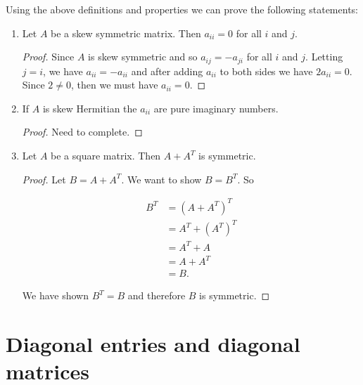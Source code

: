 \documentclass[12pt]{article}
\theoremstyle{definition}
\begin{document}
Using the above definitions and properties we can prove the following statements:

\begin{enumerate}
\item Let $A$ be a skew symmetric matrix. Then $a_{ii} = 0$ for all $i$ and $j$.

\begin{proof}
Since $A$ is skew symmetric and so $a_{ij} = -a_{ji}$ for all $i$ and $j$. Letting $j = i$,
we have $a_{ii} = -a_{ii}$ and after adding $a_{ii}$ to both sides we have $2 a_{ii} = 0$. Since
$2 \neq 0$, then we must have $a_{ii} = 0$.
\end{proof}

\item If $A$ is skew Hermitian the $a_{ii}$ are pure imaginary numbers.

\begin{proof}
Need to complete.
\end{proof}

\item Let $A$ be a square matrix. Then $A + A^T$ is symmetric.

\begin{proof}
Let $B = A + A^T$. We want to show $B = B^T$. So

\begin{align*}
B^T &= (A + A^T)^T \\
&= A^T + (A^T)^T \\
&= A^T + A \\
&= A + A^T \\
&= B.
\end{align*}

We have shown $B^T = B$ and therefore $B$ is symmetric.
\end{proof}
\end{enumerate}


\section{Diagonal entries and diagonal matrices}
\end{document}
